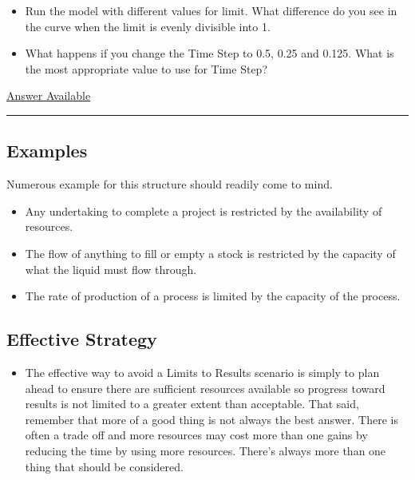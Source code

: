 \documentclass[]{memoir}
\begin{document}

\begin{itemize}
\itemsep1pt\parskip0pt
\item
  Run the model with different values for limit. What difference do you
  see in the curve when the limit is evenly divisible into 1.
\item
  What happens if you change the Time Step to 0.5, 0.25 and 0.125. What
  is the most appropriate value to use for Time Step?
\end{itemize}

\hyperref[Ans-5-1]{Answer Available}

\begin{center}\rule{3in}{0.4pt}\end{center}

\subsection{Examples}

Numerous example for this structure should readily come to mind.

\begin{itemize}
\itemsep1pt\parskip0pt
\item
  Any undertaking to complete a project is restricted by the
  availability of resources.
\item
  The flow of anything to fill or empty a stock is restricted by the
  capacity of what the liquid must flow through.
\item
  The rate of production of a process is limited by the capacity of the
  process.
\end{itemize}

\subsection{Effective Strategy}

\begin{itemize}
\itemsep1pt\parskip0pt
\item
  The effective way to avoid a Limits to Results scenario is simply to
  plan ahead to ensure there are sufficient resources available so
  progress toward results is not limited to a greater extent than
  acceptable. That said, remember that more of a good thing is not
  always the best answer. There is often a trade off and more resources
  may cost more than one gains by reducing the time by using more
  resources. There's always more than one thing that should be
  considered.
\end{itemize}
\end{document}
